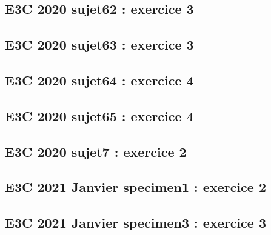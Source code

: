 \documentclass[lang=fr,edition=teacher,layout=sheet]{mxbook}
\begin{document}
\begingroup\endgroup
\par\bigskip
{}\subsection*{E3C 2020 sujet62 : exercice 3}
\begingroup\endgroup
\par\bigskip
{}\subsection*{E3C 2020 sujet63 : exercice 3}
\begingroup\endgroup
\par\bigskip
{}\subsection*{E3C 2020 sujet64 : exercice 4}
\begingroup\endgroup
\par\bigskip
{}\subsection*{E3C 2020 sujet65 : exercice 4}
\begingroup\endgroup
\par\bigskip
{}\subsection*{E3C 2020 sujet7 : exercice 2}
\begingroup\endgroup
\par\bigskip
{}\subsection*{E3C 2021 Janvier specimen1 : exercice 2}
\begingroup\endgroup
\par\bigskip
{}\subsection*{E3C 2021 Janvier specimen3 : exercice 3}
\end{document}
